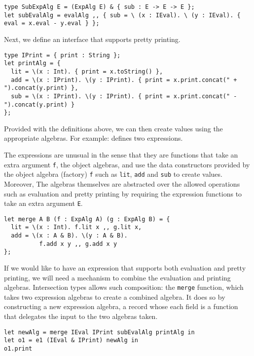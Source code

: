 \begin{verbatim}
type SubExpAlg E = (ExpAlg E) & { sub : E -> E -> E };
let subEvalAlg = evalAlg ,, { sub = \ (x : IEval). \ (y : IEval). { eval = x.eval - y.eval } };
\end{verbatim}

Next, we define an interface that supports pretty printing.

\begin{verbatim}
type IPrint = { print : String };
let printAlg = {
  lit = \(x : Int). { print = x.toString() },
  add = \(x : IPrint). \(y : IPrint). { print = x.print.concat(" + ").concat(y.print) },
  sub = \(x : IPrint). \(y : IPrint). { print = x.print.concat(" - ").concat(y.print) }
};
\end{verbatim}

Provided with the definitions above, we can then create values using the
appropriate algebras. For example:
defines two expressions.

The expressions are unusual in the sense that they are functions that take an
extra argument \lstinline{f}, the object algebras, and use the data constructors
provided by the object algebra (factory) \lstinline{f} such as \lstinline{lit},
\lstinline{add} and \lstinline{sub} to create values. Moreover, The algebras
themselves are abstracted over the allowed operations such as evaluation and
pretty printing by requiring the expression functions to take an extra argument
\lstinline{E}.

\begin{verbatim}
let merge A B (f : ExpAlg A) (g : ExpAlg B) = {
  lit = \(x : Int). f.lit x ,, g.lit x,
  add = \(x : A & B). \(y : A & B).
          f.add x y ,, g.add x y
};
\end{verbatim}

If we would like to have an expression that supports both evaluation and pretty
printing, we will need a mechanism to combine the evaluation and printing
algebras. Intersection types allows such composition: the \lstinline{merge}
function, which takes two expression algebras to create a combined algebra. It
does so by constructing a new expression algebra, a record whose each field is a
function that delegates the input to the two algebras taken.

\begin{verbatim}
let newAlg = merge IEval IPrint subEvalAlg printAlg in
let o1 = e1 (IEval & IPrint) newAlg in
o1.print
\end{verbatim}

